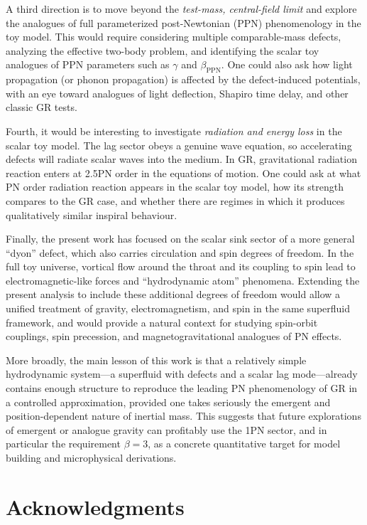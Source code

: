 \documentclass[11pt]{article}
\begin{document}
A third direction is to move beyond the \emph{test-mass, central-field limit} and explore the analogues of full param\-eterized post-Newtonian (PPN) phenomenology in the toy model. This would require considering multiple comparable-mass defects, analyzing the effective two-body problem, and identifying the scalar toy analogues of PPN parameters such as $\gamma$ and $\beta_{\mathrm{PPN}}$. One could also ask how light propagation (or phonon propagation) is affected by the defect-induced potentials, with an eye toward analogues of light deflection, Shapiro time delay, and other classic GR tests.

Fourth, it would be interesting to investigate \emph{radiation and energy loss} in the scalar toy model. The lag sector obeys a genuine wave equation, so accelerating defects will radiate scalar waves into the medium. In GR, gravitational radiation reaction enters at 2.5PN order in the equations of motion. One could ask at what PN order radiation reaction appears in the scalar toy model, how its strength compares to the GR case, and whether there are regimes in which it produces qualitatively similar inspiral behaviour.

Finally, the present work has focused on the scalar sink sector of a more general ``dyon'' defect, which also carries circulation and spin degrees of freedom. In the full toy universe, vortical flow around the throat and its coupling to spin lead to electromagnetic-like forces and ``hydrodynamic atom'' phenomena. Extending the present analysis to include these additional degrees of freedom would allow a unified treatment of gravity, electromagnetism, and spin in the same superfluid framework, and would provide a natural context for studying spin-orbit couplings, spin precession, and magnetogravitational analogues of PN effects.

More broadly, the main lesson of this work is that a relatively simple hydrodynamic system---a superfluid with defects and a scalar lag mode---already contains enough structure to reproduce the leading PN phenomenology of GR in a controlled approximation, provided one takes seriously the emergent and position-dependent nature of inertial mass. This suggests that future explorations of emergent or analogue gravity can profitably use the 1PN sector, and in particular the requirement $\beta = 3$, as a concrete quantitative target for model building and microphysical derivations.

\section*{Acknowledgments}
\end{document}
